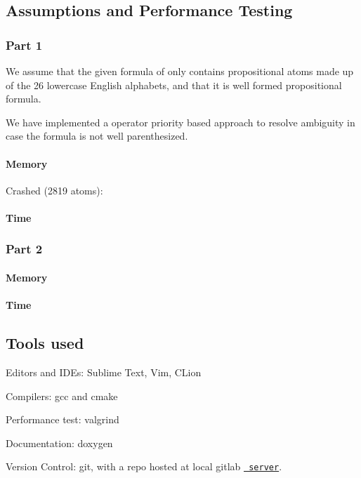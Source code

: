 \subsection*{Assumptions and Performance Testing}

\subsubsection*{Part 1}


\begin{DoxyItemize}
\item We assume that the given formula of only contains propositional atoms made up of the 26 lowercase English alphabets, and that it is well formed propositional formula.
\item We have implemented a operator priority based approach to resolve ambiguity in case the formula is not well parenthesized.
\end{DoxyItemize}

\paragraph*{Memory}

  Crashed (2819 atoms)\+: 

\paragraph*{Time}



\subsubsection*{Part 2}

\paragraph*{Memory}



\paragraph*{Time}



\subsection*{Tools used}


\begin{DoxyItemize}
\item Editors and I\+D\+Es\+: Sublime Text, Vim, C\+Lion
\item Compilers\+: gcc and cmake
\item Performance test\+: valgrind
\item Documentation\+: doxygen
\item Version Control\+: git, with a repo hosted at local gitlab \href{https://td.bits-hyderabad.ac.in/lab/mach64/logic-assgn-2/}\texttt{ server}.
\end{DoxyItemize}

